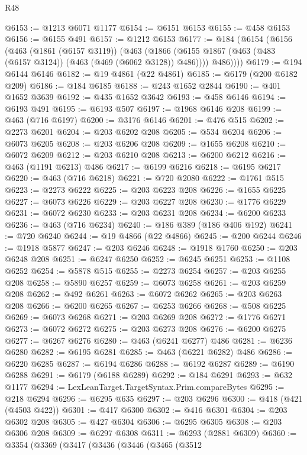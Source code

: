 \begin{lexlean}{R48}
\begin{coremodule}
@6153 := @1213 @6071 @1177
@6154 := @6151 @6153
@6155 := @458 @6153
@6156 := @6155 @491
@6157 := @1212 @6153
@6177 := @184
    (@6154
      (@6156
        (@463
          (@1861 (@6157 @3119))
          (@463
            (@1866 (@6155 @1867 (@463 (@483 (@6157 @3124)) (@463 (@469 (@6062 @3128)) @486))))
            @486))))
@6179 := @194 @6144 @6146
@6182 := @19 @4861 (@22 @4861)
@6185 := @6179 (@200 @6182 @209)
@6186 := @184 @6185
@6188 := @243 @1652 @2844
@6190 := @401 @1652 @3639
@6192 := @435 @1652 @3642
@6193 := @458 @6146
@6194 := @6193 @491
@6195 := @6193 @507
@6197 := @1968 @6146 @208
@6199 := @463 (@716 @6197)
@6200 := @3176 @6146
@6201 := @476 @515
@6202 := @2273 @6201
@6204 := @203 @6202 @208
@6205 := @534 @6204
@6206 := @6073 @6205
@6208 := @203 @6206 @208
@6209 := @1655 @6208
@6210 := @6072 @6209
@6212 := @203 @6210 @208
@6213 := @6200 @6212
@6216 := @463 (@1191 @6213) @486
@6217 := @6199 @6216
@6218 := @6195 @6217
@6220 := @463 (@716 @6218)
@6221 := @720 @2080
@6222 := @1761 @515
@6223 := @2273 @6222
@6225 := @203 @6223 @208
@6226 := @1655 @6225
@6227 := @6073 @6226
@6229 := @203 @6227 @208
@6230 := @1776 @6229
@6231 := @6072 @6230
@6233 := @203 @6231 @208
@6234 := @6200 @6233
@6236 := @463 (@716 @6234)
@6240 := @186 @389 (@186 @406 @192)
@6241 := @720 @6240
@6244 := @19 @4866 (@22 @4866)
@6245 := @200 @6244
@6246 := @1918 @5877
@6247 := @203 @6246
@6248 := @1918 @1760
@6250 := @203 @6248 @208
@6251 := @6247 @6250
@6252 := @6245 @6251
@6253 := @1108 @6252
@6254 := @5878 @515
@6255 := @2273 @6254
@6257 := @203 @6255 @208
@6258 := @5890 @6257
@6259 := @6073 @6258
@6261 := @203 @6259 @208
@6262 := @492 @6261
@6263 := @6072 @6262
@6265 := @203 @6263 @208
@6266 := @6200 @6265
@6267 := @6253 @6266
@6268 := @508 @6225
@6269 := @6073 @6268
@6271 := @203 @6269 @208
@6272 := @1776 @6271
@6273 := @6072 @6272
@6275 := @203 @6273 @208
@6276 := @6200 @6275
@6277 := @6267 @6276
@6280 := @463 (@6241 @6277) @486
@6281 := @6236 @6280
@6282 := @6195 @6281
@6285 := @463 (@6221 @6282) @486
@6286 := @6220 @6285
@6287 := @6194 @6286
@6288 := @6192 @6287
@6289 := @6190 @6288
@6291 := @6179 (@6188 @6289)
@6292 := @184 @6291
@6293 := @632 @1177
@6294 := LexLeanTarget.TargetSyntax.Prim.compareBytes
@6295 := @218 @6294
@6296 := @6295 @635
@6297 := @203 @6296
@6300 := @418 (@421 (@4503 @422))
@6301 := @417 @6300
@6302 := @416 @6301
@6304 := @203 @6302 @208
@6305 := @427 @6304
@6306 := @6295 @6305
@6308 := @203 @6306 @208
@6309 := @6297 @6308
@6311 := @6293 (@2881 @6309)
@6360 := @3354
    (@3369
      (@3417
        (@3436
          (@3446
            (@3465
              (@3512

\end{coremodule}
\end{lexlean}
